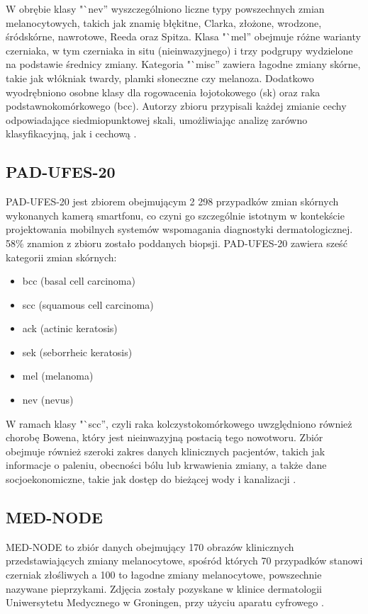 W obrębie klasy "`nev'' wyszczególniono liczne typy powszechnych zmian melanocytowych, takich jak znamię błękitne, Clarka, złożone, wrodzone, śródskórne, nawrotowe, Reeda oraz Spitza.
Klasa "`mel'' obejmuje różne warianty czerniaka, w tym czerniaka in situ (nieinwazyjnego) i trzy podgrupy wydzielone na podstawie średnicy zmiany.
Kategoria "`misc'' zawiera łagodne zmiany skórne, takie jak włókniak twardy, plamki słoneczne czy melanoza.
Dodatkowo wyodrębniono osobne klasy dla rogowacenia łojotokowego (sk) oraz raka podstawnokomórkowego (bcc).
Autorzy zbioru przypisali każdej zmianie cechy odpowiadające siedmiopunktowej skali, umożliwiając analizę zarówno klasyfikacyjną, jak i cechową \cite{Hamarneh_2019}.

\subsection{PAD-UFES-20}
PAD-UFES-20 jest zbiorem obejmującym 2 298 przypadków zmian skórnych wykonanych kamerą smartfonu, co czyni go szczególnie istotnym w kontekście projektowania mobilnych systemów wspomagania diagnostyki dermatologicznej.
58\% znamion z zbioru zostało poddanych biopsji.
PAD-UFES-20 zawiera sześć kategorii zmian skórnych:
\begin{itemize}
	\item bcc (basal cell carcinoma)
	\item scc (squamous cell carcinoma)
	\item ack (actinic keratosis)
	\item sek (seborrheic keratosis)
	\item mel (melanoma)
	\item nev (nevus)
\end{itemize}
W ramach klasy "`scc'', czyli raka kolczystokomórkowego uwzględniono również chorobę Bowena, który jest nieinwazyjną postacią tego nowotworu.
Zbiór obejmuje również szeroki zakres danych klinicznych pacjentów, takich jak informacje o paleniu, obecności bólu lub krwawienia zmiany, a także dane socjoekonomiczne, takie jak dostęp do bieżącej wody i kanalizacji \cite{Castro_2020}.

\subsection{MED-NODE}
MED-NODE to zbiór danych obejmujący 170 obrazów klinicznych przedstawiających zmiany melanocytowe, spośród których 70 przypadków stanowi czerniak złośliwych a 100 to łagodne zmiany melanocytowe, powszechnie nazywane pieprzykami.
Zdjęcia zostały pozyskane w klinice dermatologii Uniwersytetu Medycznego w Groningen, przy użyciu aparatu cyfrowego \cite{giotis2015med}.


